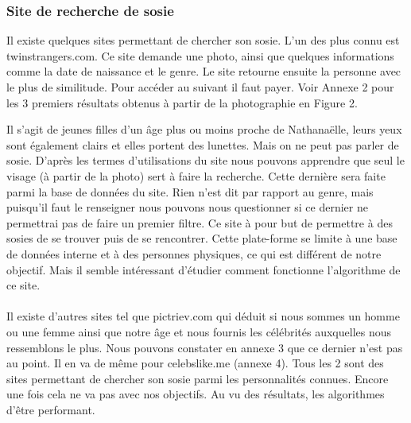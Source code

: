 \documentclass[a4paper,12pt]{article}
\begin{document}
\subsubsection{Site de recherche de sosie}
Il existe quelques sites permettant de chercher son sosie. L'un des plus connu est twinstrangers.com. Ce site demande une photo, ainsi que quelques informations comme la date de naissance et le genre. Le site retourne ensuite la personne avec le plus de similitude. Pour accéder au suivant il faut payer. 
Voir Annexe 2 pour les 3 premiers résultats obtenus à partir de la photographie en Figure 2. 
    
Il s'agit de jeunes filles d'un âge plus ou moins proche de Nathanaëlle, leurs yeux sont également clairs et elles portent des lunettes. Mais on ne peut pas parler de sosie. 
D'après les termes d'utilisations du site nous pouvons apprendre que seul le visage (à partir de la photo) sert à faire la recherche. Cette dernière sera faite parmi la base de données du site. Rien n'est dit par rapport au genre, mais puisqu'il faut le renseigner nous pouvons nous questionner si ce dernier ne permettrai pas de faire un premier filtre. Ce site à pour but de permettre à des sosies de se trouver puis de se rencontrer. Cette plate-forme se limite à une base de données interne et à des personnes physiques, ce qui est différent de notre objectif.
Mais il semble intéressant d'étudier comment fonctionne l'algorithme de ce site. 
\\\\
Il existe d'autres sites tel que pictriev.com qui déduit si nous sommes un homme ou une femme ainsi que notre âge et nous fournis les célébrités auxquelles nous ressemblons le plus. Nous pouvons constater en annexe 3 que ce dernier n'est pas au point. Il en va de même pour celebslike.me (annexe 4). Tous les 2 sont des sites permettant de chercher son sosie parmi les personnalités connues. Encore une fois cela ne va pas avec nos objectifs. Au vu des résultats, les algorithmes d'être performant.
\end{document}
